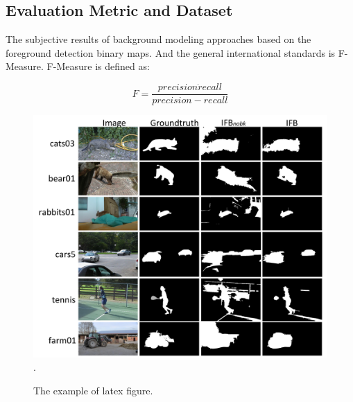 \documentclass[journal]{IEEEtran}
\begin{document}
\subsection{Evaluation Metric and Dataset}
The subjective results of background modeling approaches based on the foreground detection binary maps.
And the general international standards is F-Measure.
F-Measure is defined as:

\begin{equation}
    F=\frac{precision \dot recall}{precision - recall}
\end{equation}
\begin{figure}[!t]	%
\centering
\includegraphics[width=.5\textwidth]{figure/fig_roc_fg}
\DeclareGraphicsExtensions.
    \caption{The example of latex figure.}
\label{fig_FBMS_nobk}
\end{figure}
\end{document}
